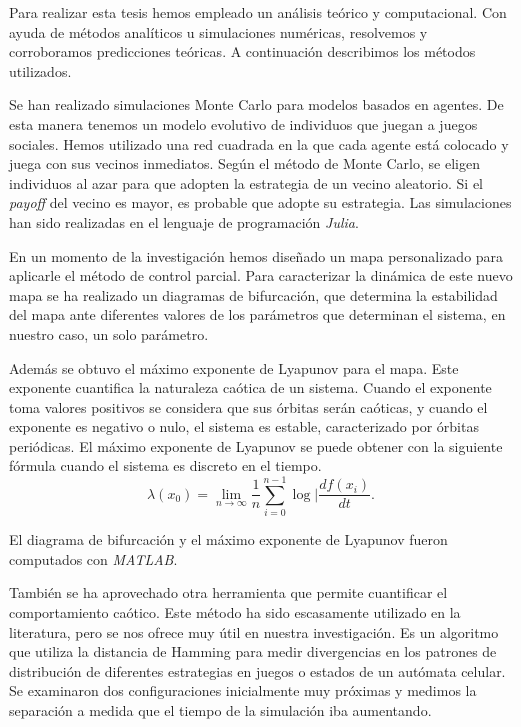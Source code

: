 Para realizar esta tesis hemos empleado un análisis teórico y computacional. Con ayuda de métodos analíticos u simulaciones numéricas, resolvemos y corroboramos predicciones teóricas. A continuación describimos los métodos utilizados.


Se han realizado simulaciones Monte Carlo para modelos basados en agentes. De esta manera tenemos un modelo evolutivo de individuos que juegan a juegos sociales. Hemos utilizado una red cuadrada en la que cada agente está colocado y juega con sus vecinos inmediatos. Según el método de Monte Carlo, se eligen individuos al azar para que adopten la estrategia de un vecino aleatorio. Si el \textit{payoff} del vecino es mayor, es probable que adopte su estrategia. Las simulaciones han sido realizadas en el lenguaje de programación \textit{Julia}.

En un momento de la investigación hemos diseñado un mapa personalizado para aplicarle el método de control parcial. Para caracterizar la dinámica de este nuevo mapa se ha realizado un diagramas de bifurcación, que determina la estabilidad del mapa ante diferentes valores de los parámetros que determinan el sistema, en nuestro caso, un solo parámetro. 

Además se obtuvo el máximo exponente de Lyapunov para el mapa. Este exponente cuantifica la naturaleza caótica de un sistema. Cuando el exponente toma valores positivos se considera que sus órbitas serán caóticas, y cuando el exponente es negativo o nulo, el sistema es estable, caracterizado por órbitas periódicas. El máximo exponente de Lyapunov se puede obtener con la siguiente fórmula cuando el sistema es discreto en el tiempo.
\begin{equation}
\lambda(x_0) = \lim_{n \to \infty}\dfrac{1}{n}\sum_{i=0}^{n-1}\log|\dfrac{df(x_i)}{dt}.
\end{equation}

El diagrama de bifurcación y el máximo exponente de Lyapunov fueron computados con \textit{MATLAB}.

También se ha aprovechado otra herramienta que permite cuantificar el comportamiento caótico. Este método ha sido escasamente utilizado en la literatura, pero se nos ofrece muy útil en nuestra investigación. Es un algoritmo que utiliza la distancia de Hamming para medir divergencias en los patrones de distribución de diferentes estrategias en juegos o estados de un autómata celular. Se examinaron dos configuraciones inicialmente muy próximas y medimos la separación a medida que el tiempo de la simulación iba aumentando. 


